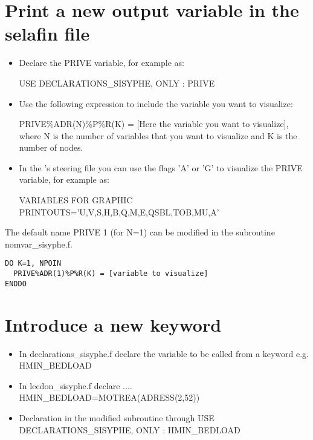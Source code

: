 \section{Print a new output variable in the selafin file}
\begin{itemize}
\item Declare the {\ttfamily PRIVE} variable, for example as:
  
{\ttfamily USE DECLARATIONS\_SISYPHE, ONLY : PRIVE}

\item Use the following expression to include the variable you want to visualize:

{\ttfamily PRIVE\%ADR(N)\%P\%R(K) = [Here the variable you want to visualize]}, where {\ttfamily N} is the number of variables that you want to visualize and {\ttfamily K} is the number of nodes.  

\item In the \sisyphe's steering file you can use the flags {\ttfamily'A'} or {\ttfamily'G'} to visualize the {\ttfamily PRIVE} variable, for example as:
  
{\ttfamily VARIABLES FOR GRAPHIC PRINTOUTS='U,V,S,H,B,Q,M,E,QSBL,TOB,MU,A'}
\end{itemize}

The default name {\ttfamily PRIVE 1} (for {\ttfamily N=1}) can be modified in the subroutine {\ttfamily nomvar\_sisyphe.f}.

\begin{lstlisting}[frame=trBL]
DO K=1, NPOIN
  PRIVE%ADR(1)%P%R(K) = [variable to visualize]
ENDDO  
\end{lstlisting}  

\section{Introduce a new keyword}
\begin{itemize}
\item In {\ttfamily declarations\_sisyphe.f} declare the variable to be called from a keyword e.g. {\ttfamily HMIN\_BEDLOAD}
\item In {\ttfamily lecdon\_sisyphe.f} declare .... {\ttfamily HMIN\_BEDLOAD=MOTREA(ADRESS(2,52))}
\item Declaration in the modified subroutine through {\ttfamily USE DECLARATIONS\_SISYPHE, ONLY : HMIN\_BEDLOAD}
\end{itemize}


